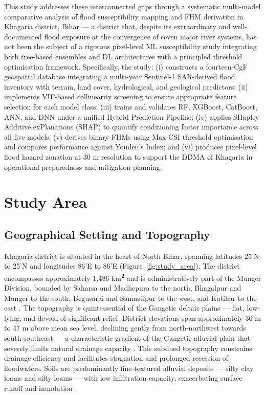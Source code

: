 \documentclass[12pt, a4paper]{article}
\begin{document}
This study addresses these interconnected gaps through a systematic multi-model comparative analysis of flood susceptibility mapping and FHM derivation in Khagaria district, Bihar --- a district that, despite its extraordinary and well-documented flood exposure at the convergence of seven major river systems, has not been the subject of a rigorous pixel-level ML susceptibility study integrating both tree-based ensembles and DL architectures with a principled threshold optimisation framework. Specifically, the study: (i) constructs a fourteen-CgF geospatial database integrating a multi-year Sentinel-1 SAR-derived flood inventory with terrain, land cover, hydrological, and geological predictors; (ii) implements VIF-based collinearity screening to ensure appropriate feature selection for each model class; (iii) trains and validates RF, XGBoost, CatBoost, ANN, and DNN under a unified Hybrid Prediction Pipeline; (iv) applies SHapley Additive exPlanations (SHAP) to quantify conditioning factor importance across all five models;  (v) derives binary FHMs using Max-CSI threshold optimisation and compares performance against Youden's Index; and (vi) produces pixel-level flood hazard zonation at 30 m resolution to support the DDMA of Khagaria in operational preparedness and mitigation planning.

\section{Study Area}

\subsection{Geographical Setting and Topography}

Khagaria district is situated in the heart of North Bihar, spanning latitudes 25'N to 25'N and longitudes 86'E to 86'E (Figure~\ref{fig:study_area}). The district encompasses approximately 1,486 km\textsuperscript{2} and is administratively part of the Munger Division, bounded by Saharsa and Madhepura to the north, Bhagalpur and Munger to the south, Begusarai and Samastipur to the west, and Katihar to the east \citep{khagdist2024}. The topography is quintessential of the Gangetic deltaic plains --- flat, low-lying, and devoid of significant relief. District elevations span approximately 36 m to 47 m above mean sea level, declining gently from north-northwest towards south-southeast --- a characteristic gradient of the Gangetic alluvial plain that severely limits natural drainage capacity \citep{khagdist2024}. This subdued topography constrains drainage efficiency and facilitates stagnation and prolonged recession of floodwaters. Soils are predominantly fine-textured alluvial deposits --- silty clay loams and silty loams --- with low infiltration capacity, exacerbating surface runoff and inundation \citep{NBSSLUPbihar2020}.
\end{document}
